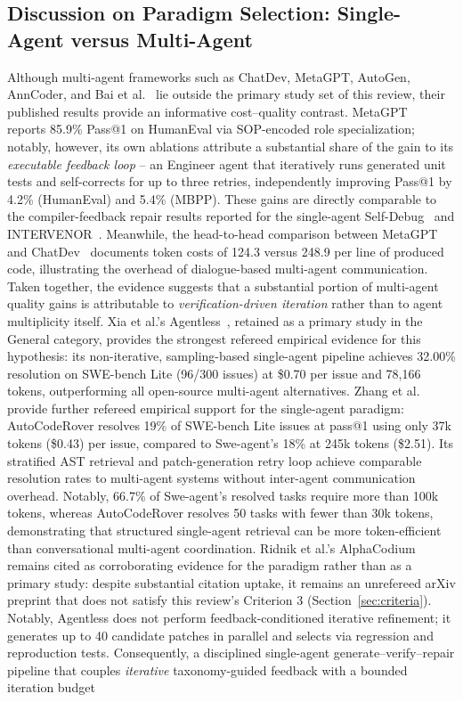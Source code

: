 \documentclass[10pt,a4paper]{article}
\begin{document}
\subsection{Discussion on Paradigm Selection: Single-Agent versus Multi-Agent}
\label{sec:paradigm_discussion}
Although multi-agent frameworks such as ChatDev, MetaGPT, AutoGen, AnnCoder, and Bai et al.~\cite{qian2023chatdev,hong2023metagpt,wu2023autogen,zhang2025anncoder,bai2025collab} lie outside the primary study set of this review, their published results provide an informative cost--quality contrast. MetaGPT~\cite{hong2023metagpt} reports 85.9\% Pass@1 on HumanEval via SOP-encoded role specialization; notably, however, its own ablations attribute a substantial share of the gain to its \textit{executable feedback loop} -- an Engineer agent that iteratively runs generated unit tests and self-corrects for up to three retries, independently improving Pass@1 by 4.2\% (HumanEval) and 5.4\% (MBPP). These gains are directly comparable to the compiler-feedback repair results reported for the single-agent Self-Debug~\cite{chen2023selfdebug} and INTERVENOR~\cite{wang2024intervenor}. Meanwhile, the head-to-head comparison between MetaGPT and ChatDev~\cite{qian2023chatdev} documents token costs of 124.3 versus 248.9 per line of produced code, illustrating the overhead of dialogue-based multi-agent communication. Taken together, the evidence suggests that a substantial portion of multi-agent quality gains is attributable to \textit{verification-driven iteration} rather than to agent multiplicity itself. Xia et al.'s Agentless~\cite{xia2025agentless}, retained as a primary study in the General category, provides the strongest refereed empirical evidence for this hypothesis: its non-iterative, sampling-based single-agent pipeline achieves 32.00\% resolution on SWE-bench Lite (96/300 issues) at \$0.70 per issue and 78{,}166 tokens, outperforming all open-source multi-agent alternatives. Zhang et al.~\cite{zhang2024autocoderover} provide further refereed empirical support for the single-agent paradigm: AutoCodeRover resolves 19\% of SWE-bench Lite issues at pass@1 using only 37k tokens (\$0.43) per issue, compared to Swe-agent's 18\% at 245k tokens (\$2.51). Its stratified AST retrieval and patch-generation retry loop achieve comparable resolution rates to multi-agent systems without inter-agent communication overhead. Notably, 66.7\% of Swe-agent's resolved tasks require more than 100k tokens, whereas AutoCodeRover resolves 50 tasks with fewer than 30k tokens, demonstrating that structured single-agent retrieval can be more token-efficient than conversational multi-agent coordination. Ridnik et al.'s AlphaCodium~\cite{ridnik2024} remains cited as corroborating evidence for the paradigm rather than as a primary study: despite substantial citation uptake, it remains an unrefereed arXiv preprint that does not satisfy this review's Criterion 3 (Section~\ref{sec:criteria}). Notably, Agentless does not perform feedback-conditioned iterative refinement; it generates up to 40 candidate patches in parallel and selects via regression and reproduction tests. Consequently, a disciplined single-agent generate--verify--repair pipeline that couples \textit{iterative} taxonomy-guided feedback with a bounded iteration budget 
\end{document}

